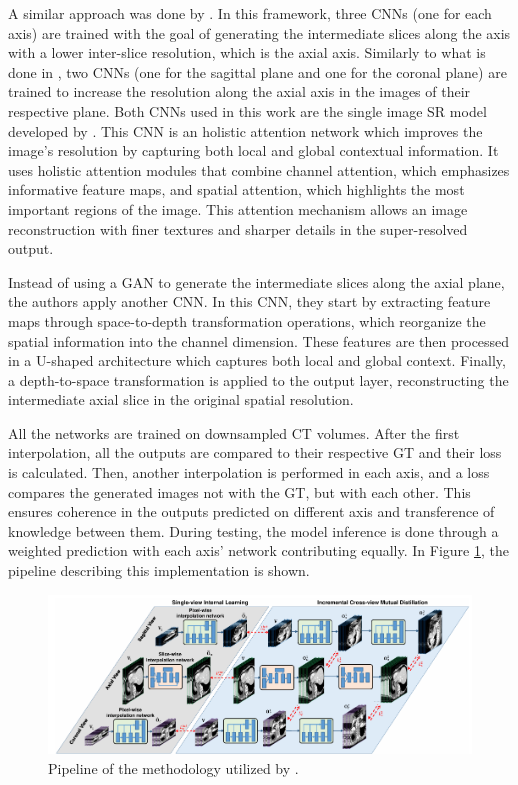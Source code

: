 A similar approach was done by \textcite{Fang2022}. In this framework, three CNNs (one for each axis) are trained with the goal of generating the intermediate slices along the axis with a lower inter-slice resolution, which is the axial axis. Similarly to what is done in \textcite{Zhang2024}, two CNNs (one for the sagittal plane and one for the coronal plane) are trained to increase the resolution along the axial axis in the images of their respective plane. Both CNNs used in this work are the single image SR model developed by \textcite{Niu2020}. This CNN is an holistic attention network which improves the image's resolution by capturing both local and global contextual information. It uses holistic attention modules that combine channel attention, which emphasizes informative feature maps, and spatial attention, which highlights the most important regions of the image. This attention mechanism allows an image reconstruction with finer textures and sharper details in the super-resolved output.
\par
Instead of using a GAN to generate the intermediate slices along the axial plane, the authors apply another CNN. In this CNN, they start by extracting feature maps through space-to-depth transformation operations, which reorganize the spatial information into the channel dimension. These features are then processed in a U-shaped architecture which captures both local and global context. Finally, a depth-to-space transformation is applied to the output layer, reconstructing the intermediate axial slice in the original spatial resolution.
\par
All the networks are trained on downsampled CT volumes. After the first interpolation, all the outputs are compared to their respective GT and their loss is calculated. Then, another interpolation is performed in each axis, and a loss compares the generated images not with the GT, but with each other. This ensures coherence in the outputs predicted on different axis and transference of knowledge between them. During testing, the model inference is done through a weighted prediction with each axis' network contributing equally. In Figure \ref{fig:FangArchitecture}, the pipeline describing this implementation is shown.

\begin{figure}[!ht]
	\hspace*{-1.0in}
	\includegraphics[width=1.25\linewidth]{figures/FangArchitecture.png}
	\caption{Pipeline of the methodology utilized by \textcite{Fang2022}.}
	\label{fig:FangArchitecture}
\end{figure}

